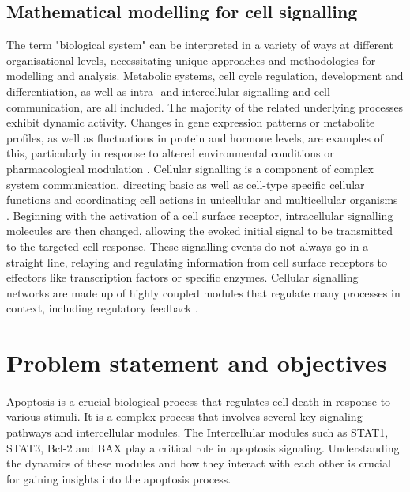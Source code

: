 \subsection{Mathematical modelling for cell signalling}

The term "biological system" can be interpreted in a variety of ways at different organisational levels, necessitating unique approaches and methodologies for modelling and analysis. Metabolic systems, cell cycle regulation, development and differentiation, as well as intra- and intercellular signalling and cell communication, are all included. The majority of the related underlying processes exhibit dynamic activity. Changes in gene expression patterns or metabolite profiles, as well as fluctuations in protein and hormone levels, are examples of this, particularly in response to altered environmental conditions or pharmacological modulation \cite{feitelson2015sustained}. Cellular signalling is a component of complex system communication, directing basic as well as cell-type specific cellular functions and coordinating cell actions in unicellular and multicellular organisms \cite{danos2007rule}. Beginning with the activation of a cell surface receptor, intracellular signalling molecules are then changed, allowing the evoked initial signal to be transmitted to the targeted cell response. These signalling events do not always go in a straight line, relaying and regulating information from cell surface receptors to effectors like transcription factors or specific enzymes. Cellular signalling networks are made up of highly coupled modules that regulate many processes in context, including regulatory feedback \cite{jordan2000interleukin}.

\section{Problem statement and objectives}
\paragraph{}

Apoptosis is a crucial biological process that regulates cell death in response to various stimuli. It is a complex process that involves several key signaling pathways and intercellular modules. The Intercellular modules such as STAT1, STAT3, Bcl-2 and BAX play a critical role in apoptosis signaling. Understanding the dynamics of these modules and how they interact with each other is crucial for gaining insights into the apoptosis process.


